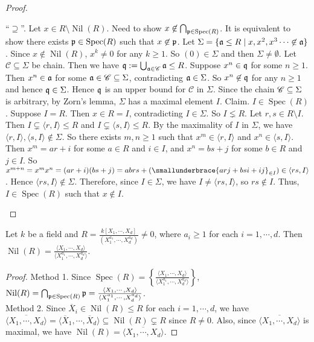 \begin{proof}
\begin{enumerate}
            ``$\supseteq$''. Let $x \in R \setminus \operatorname{Nil}(R)$. Need to show $x \not \in \bigcap_{\mathfrak{p} \in \operatorname{Spec}(R)}$. It is equivalent to show there exists $\mathfrak{p} \in \operatorname{Spec}(R)$ such that $x \not \in \mathfrak{p}$. Let $\Sigma = \{\mathfrak{a} \leq R \mid x,x^2,x^3 \cdots \not \in \mathfrak{a}\}$. Since $x \not \in \operatorname{Nil}(R)$, $x^k \neq 0$ for any $k \geq 1$. So $(0) \in \Sigma$ and then $\Sigma \neq \emptyset$. Let $\mathscr C \subseteq \Sigma$ be chain. Then we have $\mathfrak{q} := \bigcup_{\mathfrak{a} \in \mathscr C} \mathfrak{a} \leq R$. Suppose $x^n \in \mathfrak{q}$ for some $n \geq 1$. Then $x^n \in \mathfrak{a}$ for some $\mathfrak{a} \in \mathscr C \subseteq \Sigma$, contradicting $\mathfrak{a} \in \Sigma$. So $x^n \not \in \mathfrak{q}$ for any $n \geq 1$ and hence $\mathfrak{q} \in \Sigma$. Hence $\mathfrak{q}$ is an upper bound for $\mathscr C$ in $\Sigma$. Since the chain $\mathscr{C} \subseteq \Sigma$ is arbitrary, by Zorn's lemma, $\Sigma$ has a maximal element $I$. Claim. $I \in \operatorname{Spec}(R)$. Suppose $I = R$. Then $x \in R = I$, contradicting $I \in \Sigma$. So $I \lneq R$. Let $r,s \in R \setminus I$. Then $I \subsetneq \langle r,I \rangle \leq R$ and $I \subsetneq \langle s,I \rangle \leq R$. By the maximality of $I$ in $\Sigma$, we have $\langle r,I \rangle, \langle s,I \rangle \not \in \Sigma$. So there exists $m,n \geq 1$ such that $x^m \in \langle r,I \rangle$ and $x^n \in \langle s,I \rangle$. Then $x^m = ar+i$ for some $a \in R$ and $i \in I$, and $x^n = bs + j$ for some $b \in R$ and $j \in I$. So $x^{m+n} = x^m x^n = (ar+i)(bs+j) = abrs + (\smallunderbrace{arj+bsi+ij}_{\in I}) \in \langle rs,I \rangle$. Hence $\langle rs, I \rangle \not\in \Sigma$. Therefore, since $I \in \Sigma$, we have $I \neq \langle rs,I \rangle$, so $rs \not \in I$. Thus, $I \in \operatorname{Spec}(R)$ such that $x \not \in I$. \qedhere
    \end{enumerate}
\end{proof}

\begin{example*}
    Let $k$ be a field and $R = \frac{k[X_1,\cdots,X_d]}{(X_1^{a_1},\cdots,X_d^{a_d})} \neq 0$, where $a_i \geq 1$ for each $i = 1,\cdots,d$. Then $\operatorname{Nil}(R) = \frac{\langle X_1,\cdots,X_d \rangle}{\langle X_1^{a_1},\cdots,X_d^{a_d} \rangle}$.
\end{example*}

\begin{proof}
    Method 1. Since $\operatorname{Spec}(R) = \left\{\frac{\langle X_1,\cdots,X_d \rangle}{\langle X_1^{a_1},\cdots,X_d^{a_d} \rangle}\right\}$, $\operatorname{Nil}(R) = \bigcap_{\mathfrak{p} \in \operatorname{Spec}(R)} \mathfrak{p} =  \frac{\langle X_1,\cdots,X_d \rangle}{\langle X_1^{a_1},\cdots,X_d^{a_d} \rangle}$. \\
    Method 2. Since $\overbar X_i \in \operatorname{Nil}(R) \leq R$ for each $i = 1,\cdots,d$, we have $\overbar {\langle X_1,\cdots,X_d \rangle} = \langle \overbar X_1,\cdots,\overbar X_d \rangle \subseteq \operatorname{Nil}(R) \subsetneq R$ since $R \neq 0$. Also, since $\overbar {\langle X_1,\cdots,X_d \rangle}$ is maximal, we have $\operatorname{Nil}(R) = \overbar {\langle X_1,\cdots,X_d \rangle}$.
\end{proof}

